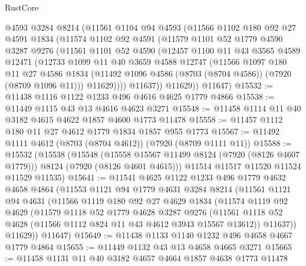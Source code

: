 \begin{lexlean}{RustCore}
\begin{coremodule}
      @4593
      @3284
      @8214
      (@11561
        @1104
        @94
        @4593
        (@11566
          @1102
          @180
          @92
          @27
          @4591
          @1834
          (@11574
            @1102
            @92
            @4591
            (@11579
              @1101
              @52
              @1779
              @4590
              @3287
              @9276
              (@11561
                @1101
                @52
                @4590
                (@12457
                  @1100
                  @11
                  @43
                  @3565
                  @4589
                  @12471
                  (@12733
                    @1099
                    @11
                    @40
                    @3659
                    @4588
                    @12747
                    (@11566
                      @1097
                      @180
                      @11
                      @27
                      @4586
                      @1834
                      (@11492 @1096 @4586 (@8703 (@8704 @4586)) (@7920 (@8709 @1096 @11)))
                      @11629))))
              @11637))
          @11629))
      @11647)
@15532 := @11438 @1116 @1122 @1233 @496 @4616 @4625 @1779 @4866
@15538 := @11449 @1115 @43 @13 @4616 @4623 @3271
@15548 := @11458 @1114 @11 @40 @3182 @4615 @4622 @1857 @4600 @1773 @11478
@15558 := @11457 @1112 @180 @11 @27 @4612 @1779 @1834 @1857 @955 @1773
@15567 := @11492 @1111 @4612 (@8703 (@8704 @4612)) (@7920 (@8709 @1111 @11))
@15588 := @15532
    (@15538
      (@15548
        (@15558 @15567 @11499 @8124 (@7920 (@8126 @4607 @1779)))
        @8124
        (@7920 (@8126 @4601 @4615)))
      @11514
      @11517
      @11520
      @11524
      @11529
      @11535)
@15641 := @11541
    @4625
    @1122
    @1233
    @496
    @1779
    @4632
    @4658
    @4864
    (@11553
      @1121
      @94
      @1779
      @4631
      @3284
      @8214
      (@11561
        @1121
        @94
        @4631
        (@11566
          @1119
          @180
          @92
          @27
          @4629
          @1834
          (@11574
            @1119
            @92
            @4629
            (@11579
              @1118
              @52
              @1779
              @4628
              @3287
              @9276
              (@11561 @1118 @52 @4628 (@11566 @1112 @824 @11 @43 @4612 @3943 @15567 @13612))
              @11637))
          @11629))
      @11647)
@15649 := @11438 @1133 @1140 @1232 @496 @4658 @4667 @1779 @4864
@15655 := @11449 @1132 @43 @13 @4658 @4665 @3271
@15665 := @11458 @1131 @11 @40 @3182 @4657 @4664 @1857 @4638 @1773 @11478

\end{coremodule}
\end{lexlean}
